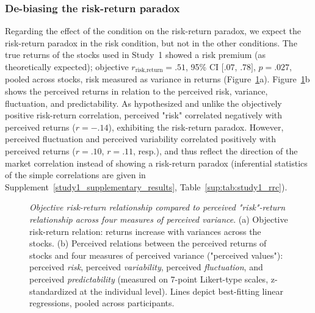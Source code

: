 \documentclass[a4paper,man, natbib,floatsintext]{apa6} %
\begin{document}
\subsubsection{De-biasing the risk-return paradox}
Regarding the effect of the condition on the risk-return paradox, we expect the risk-return paradox in the risk condition, but not in the other conditions. The true returns of the stocks used in Study~1 showed a risk premium (as theoretically expected); objective $r_{\text{risk,return}} = .51$, 95\% CI $[.07$, $.78]$, $p = .027$, pooled across stocks, risk measured as variance in returns (Figure~\ref{fig:rrc}a). Figure~\ref{fig:rrc}b shows the perceived returns in relation to the perceived risk, variance, fluctuation, and predictability. As hypothesized and unlike the objectively positive risk-return correlation, perceived "risk" correlated negatively with perceived returns ($r = -.14$), exhibiting the risk-return paradox. However, perceived fluctuation and perceived variability correlated positively with perceived returns ($r = .10$, $r = .11$, resp.), and thus reflect the direction of the market correlation instead of showing a risk-return paradox (inferential statistics of the simple correlations are given in Supplement~\ref{study1_supplementary_results}, Table~\ref{sup:tab:study1_rrc}).
%
\begin{figure}[!htbp] 
 \centering
  \caption{\textit{Objective risk-return relationship compared to perceived "risk"-return relationship across four measures of perceived variance}. (a) Objective risk-return relation: returns increase with variances across the stocks. (b) Perceived relations between the perceived returns of stocks and four measures of perceived variance ("perceived values"): perceived \textit{risk}, perceived \textit{variability}, perceived \textit{fluctuation}, and perceived \textit{predictability} (measured on 7-point Likert-type scales, z-standardized at the individual level). Lines depict best-fitting linear regressions, pooled across participants.}
  \label{fig:rrc}
\end{figure}
\end{document}

